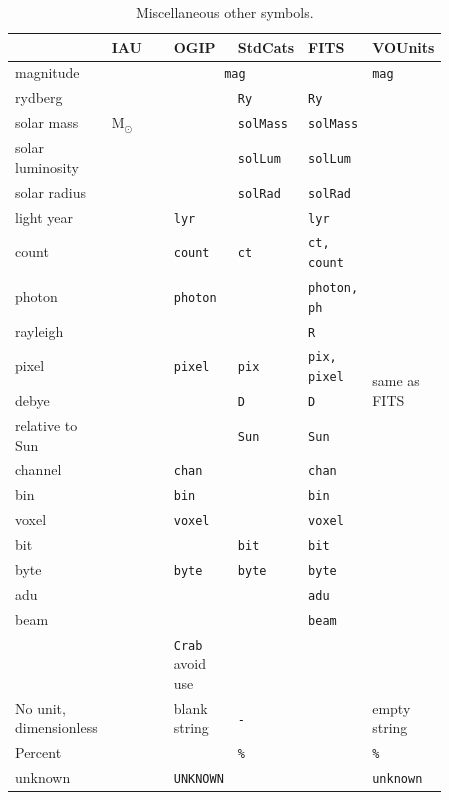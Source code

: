 \documentclass[11pt,notitlepage,onecolumn]{ivoa}
\newcommand{\unit}[1]{\texttt{\small\color{orange}#1}}
\begin{document}
\begin{table}[ht]
\begin{tabular}{|p{0.2\linewidth}|p{0.15\linewidth}|p{0.12\linewidth}|p{0.12\linewidth}|p{0.12\linewidth}|p{0.15\linewidth}|}
\hline
    & IAU & OGIP  & StdCats & FITS  & VOUnits\\\hline
    magnitude & \multicolumn{4}{c|}{\unit{mag}} & \unit{mag}\\\hline
    rydberg & \unit{} & \unit{} & \unit{Ry} & \unit{Ry} & \multirow{19}{0.15\linewidth}{same as FITS} \\\hline
    solar mass & \unit{$\mathrm{M}_\odot$} &  & \unit{solMass} & \unit{solMass} &\\\cline{1-5}
    solar luminosity & \unit{} & \unit{} & \unit{solLum} & \unit{solLum} &\\\cline{1-5}
    solar radius & \unit{} & \unit{} & \unit{solRad} & \unit{solRad} &\\\cline{1-5}
    light year & \unit{} & \unit{lyr} & \unit{} & \unit{lyr} &\\\cline{1-5}
    count & \unit{} & \unit{count} & \unit{ct} & \unit{ct, count} &\\\cline{1-5}
    photon & \unit{} & \unit{photon} & \unit{} & \unit{photon, ph} &\\\cline{1-5}
    rayleigh & \unit{} & \unit{} & \unit{} & \unit{R} &\\\cline{1-5}
    pixel & \unit{} & \unit{pixel} & \unit{pix} & \unit{pix, pixel} &\\\cline{1-5}
    debye & \unit{} & \unit{} & \unit{D} & \unit{D} &\\\cline{1-5}
    relative to Sun & \unit{} & \unit{} & \unit{Sun} & \unit{Sun} &\\\cline{1-5}
    channel & \unit{} & \unit{chan} & \unit{} & \unit{chan} &\\\cline{1-5}
    bin & \unit{} & \unit{bin} & \unit{} & \unit{bin} &\\\cline{1-5}
    voxel & \unit{} & \unit{voxel} & \unit{} & \unit{voxel} &\\\cline{1-5}
    bit & \unit{} & \unit{} & \unit{bit} & \unit{bit} &\\\cline{1-5}
    byte & \unit{} & \unit{byte} & \unit{byte} & \unit{byte} &\\\cline{1-5}
    adu & \unit{} & \unit{} & \unit{} & \unit{adu} &\\\cline{1-5}
    beam & \unit{} & \unit{} & \unit{} & \unit{beam} &\\\hline
     & \unit{} & \unit{Crab} avoid use & \unit{} & \unit{} & not used \\\hline
    No unit, dimensionless & \unit{} & blank string & \unit{-} & \unit{} & empty string \\\hline
    Percent &  &  & \unit{\%} & & \unit{\%} \\\hline
    unknown & \unit{} & {\tiny\unit{UNKNOWN}} & \unit{} & \unit{} & \unit{unknown} \\\hline
\end{tabular}
  \caption{Miscellaneous other symbols.}
  \label{tabx:comparUnitOther}
\end{table}
\end{document}
